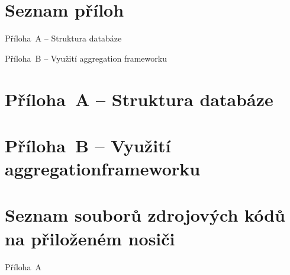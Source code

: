 \documentclass[a4paper,12pt]{article}
\begin{document}
\section*{Seznam příloh}

\noindent Příloha~A -- Struktura databáze \dotfill \pageref{prilohaA}

\noindent Příloha~B -- Využití aggregation frameworku \dotfill \pageref{prilohaB}


\clearpage {}\label{prilohaA} 
\section*{Příloha~A --  Struktura databáze}
\section*{Příloha~B --  Využití aggregation\newline frameworku}



\clearpage {} {}
\section*{Seznam souborů zdrojových kódů na přiloženém nosiči}

\noindent Příloha~A \dotfill \pageref{prilohaA}

\end{document}
